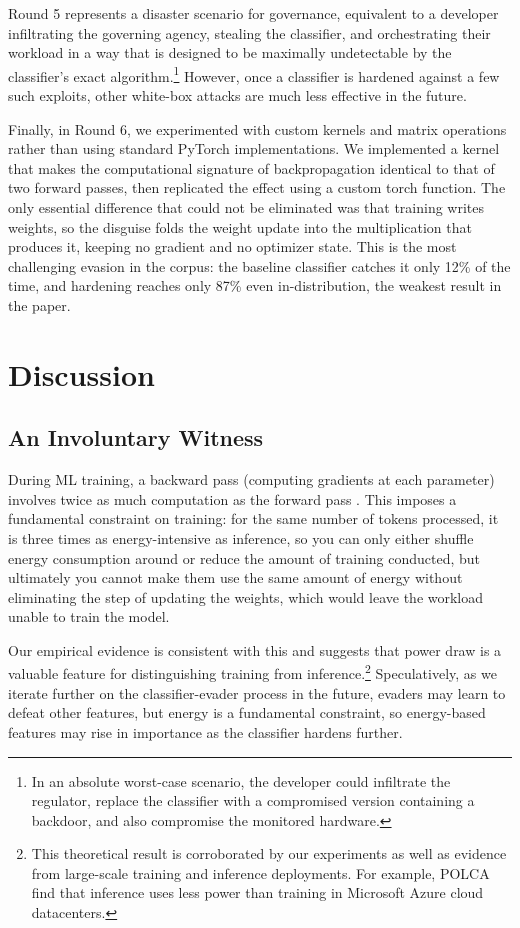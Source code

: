 Round 5 represents a disaster scenario for governance, equivalent to a developer infiltrating the governing agency, stealing the classifier, and orchestrating their workload in a way that is designed to be maximally undetectable by the classifier's exact algorithm.\footnote{In an absolute worst-case scenario, the developer could infiltrate the regulator, replace the classifier with a compromised version containing a backdoor, and also compromise the monitored hardware.} However, once a classifier is hardened against a few such exploits, other white-box attacks are much less effective in the future.

Finally, in Round 6, we experimented with custom kernels and matrix operations rather than using standard PyTorch implementations. We implemented a kernel that makes the computational signature of backpropagation identical to that of two forward passes, then replicated the effect using a custom torch function. The only essential difference that could not be eliminated was that training writes weights, so the disguise folds the weight update into the multiplication that produces it, keeping no gradient and no optimizer state. This is the most challenging evasion in the corpus: the baseline classifier catches it only 12\% of the time, and hardening reaches only 87\% even in-distribution, the weakest result in the paper.

\section{Discussion}

\subsection{An Involuntary Witness}

During ML training, a backward pass (computing gradients at each parameter) involves twice as much computation as the forward pass \citep{kaplan2020}. This imposes a fundamental constraint on training: for the same number of tokens processed, it is three times as energy-intensive as inference, so you can only either shuffle energy consumption around or reduce the amount of training conducted, but ultimately you cannot make them use the same amount of energy without eliminating the step of updating the weights, which would leave the workload unable to train the model.

Our empirical evidence is consistent with this and suggests that power draw is a valuable feature for distinguishing training from inference.\footnote{This theoretical result is corroborated by our experiments as well as evidence from large-scale training and inference deployments. For example, POLCA \citep{patel2023} find that inference uses less power than training in Microsoft Azure cloud datacenters.} Speculatively, as we iterate further on the classifier-evader process in the future, evaders may learn to defeat other features, but energy is a fundamental constraint, so energy-based features may rise in importance as the classifier hardens further.

